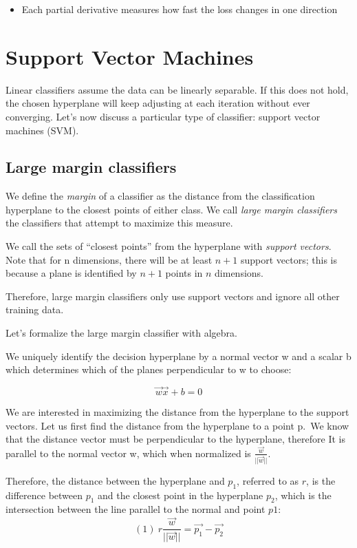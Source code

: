 \documentclass[11pt]{article}
\begin{document}
\begin{itemize}
\tightlist
\item
  Each partial derivative measures how fast the loss changes in one
  direction
\end{itemize}

\section{Support Vector Machines}\label{support-vector-machines}

Linear classifiers assume the data can be linearly separable. If this
does not hold, the chosen hyperplane will keep adjusting at each
iteration without ever converging. Let's now discuss a particular type
of classifier: support vector machines (SVM).

\subsection{Large margin classifiers}\label{large-margin-classifiers}

We define the \emph{margin} of a classifier as the distance from the
classification hyperplane to the closest points of either class. We call
\emph{large margin classifiers} the classifiers that attempt to maximize
this measure.

We call the sets of ``closest points'' from the hyperplane with
\emph{support vectors}. Note that for n dimensions, there will be at
least \(n+1\) support vectors; this is because a plane is identified by
\(n+1\) points in \(n\) dimensions.

Therefore, large margin classifiers only use support vectors and ignore
all other training data.

Let's formalize the large margin classifier with algebra.

We uniquely identify the decision hyperplane by a normal vector w and a
scalar b which determines which of the planes perpendicular to w to
choose:

\[\vec{w}\vec{x} + b = 0\]

We are interested in maximizing the distance from the hyperplane to the
support vectors. Let us first find the distance from the hyperplane to a
point p.~We know that the distance vector must be perpendicular to the
hyperplane, therefore It is parallel to the normal vector w, which when
normalized is \(\frac{\vec{w}}{||\vec{w}||}\).

Therefore, the distance between the hyperplane and \(p_1\), referred to
as \(r\), is the difference between \(p_1\) and the closest point in the
hyperplane \(p_2\), which is the intersection between the line parallel
to the normal and point \(p1\):
\[(1)\ r\frac{\vec{w}}{||\vec{w}||} = \vec{p_1} - \vec{p_2}\]
\end{document}
